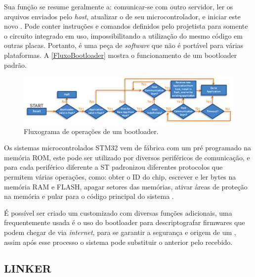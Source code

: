Sua função se resume geralmente a: comunicar-se com outro servidor, ler os arquivos enviados pelo \textit{host}, atualizar o \firmware de seu microcontrolador, e iniciar este novo \software. 
Pode conter instruções e comandos definidos pelo projetista para somente o circuito integrado em uso, impossibilitando a utilização do mesmo código em outras placas.
Portanto, é uma peça de \textit{software} que não é portável para várias plataformas. A \autoref{FluxoBootloader} mostra o funcionamento de um bootloader padrão. 

\begin{figure}[H]
    \scriptsize
     \centering
     \includegraphics[scale=0.9]{dados/figuras/FluxoBootloader.jpg}
     \caption{Fluxograma de operações de um bootloader.}
     \label{FluxoBootloader}
\end{figure}



Os sistemas microcontrolados STM32 vem de fábrica com um \bootloader pré programado na memória ROM, este \bootloader pode ser utilizado por diversos periféricos de comunicação, e para cada periférico diferente a ST padronizou diferentes protocolos que permitem várias operações, como: obter o ID do chip, escrever e ler bytes na memória RAM e FLASH, apagar setores das memórias, ativar áreas de proteção na memória e pular para o código principal do sistema \cite{Noviello2018}.

É possível ser criado um \bootloader customizado com diversas funções adicionais, uma frequentemente usada é o uso do bootloader para descriptografar firmwares que podem chegar de via \textit{internet}, para se garantir a segurança e origem de um \firmware, assim após esse processo o sistema pode substituir o \software anterior pelo recebido. 



\subsection{LINKER}

